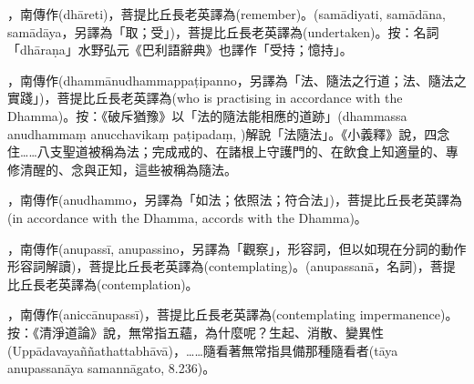 \startitemgroup[noteitems]
\item{}，南傳作(dhāreti)，菩提比丘長老英譯為(remember)。(samādiyati, samādāna, samādāya，另譯為「取；受」)，菩提比丘長老英譯為(undertaken)。按：名詞「dhāraṇa」水野弘元《巴利語辭典》也譯作「受持；憶持」。
\stopitemgroup

\startitemgroup[noteitems]
\item{}，南傳作(dhammānudhammappaṭipanno，另譯為「法、隨法之行道；法、隨法之實踐」)，菩提比丘長老英譯為(who is practising in accordance with the Dhamma)。按：《破斥猶豫》以「法的隨法能相應的道跡」(dhammassa anudhammaṃ anucchavikaṃ paṭipadaṃ, )解說「法隨法」。《小義釋》說，四念住……八支聖道被稱為法；完成戒的、在諸根上守護門的、在飲食上知適量的、專修清醒的、念與正知，這些被稱為隨法。
\item{}，南傳作(anudhammo，另譯為「如法；依照法；符合法」)，菩提比丘長老英譯為(in accordance with the Dhamma, accords with the Dhamma)。
\stopitemgroup

\startitemgroup[noteitems]
\item{}，南傳作(anupassī, anupassino，另譯為「觀察」，形容詞，但以如現在分詞的動作形容詞解讀)，菩提比丘長老英譯為(contemplating)。(anupassanā，名詞)，菩提比丘長老英譯為(contemplation)。
\item{}，南傳作(aniccānupassī)，菩提比丘長老英譯為(contemplating impermanence)。按：《清淨道論》說，無常指五蘊，為什麼呢？生起、消散、變異性(Uppādavayaññathattabhāvā)，……隨看著無常指具備那種隨看者(tāya anupassanāya samannāgato, 8.236)。
\stopitemgroup

